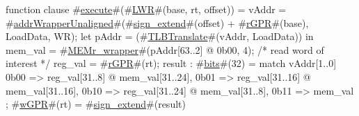 function clause #\hyperref[zexecute]{execute}#(#\hyperref[zLWR]{LWR}#(base, rt, offset)) =
      {
        vAddr = #\hyperref[zaddrWrapperUnaligned]{addrWrapperUnaligned}#(#\hyperref[zsignzyextend]{sign\_extend}#(offset) + #\hyperref[zrGPR]{rGPR}#(base), LoadData, WR);
        let pAddr = (#\hyperref[zTLBTranslate]{TLBTranslate}#(vAddr, LoadData)) in
          {
            mem_val = #\hyperref[zMEMrzywrapper]{MEMr\_wrapper}#(pAddr[63..2] @ 0b00, 4); /* read word of interest */
            reg_val = #\hyperref[zrGPR]{rGPR}#(rt);
            result : #\hyperref[zbits]{bits}#(32) = match vAddr[1..0]
              {
                0b00  => reg_val[31..8]  @ mem_val[31..24],
                0b01  => reg_val[31..16] @ mem_val[31..16],
                0b10  => reg_val[31..24] @ mem_val[31..8],
                0b11  => mem_val
              };
	    #\hyperref[zwGPR]{wGPR}#(rt) = #\hyperref[zsignzyextend]{sign\_extend}#(result)
          }
      }
